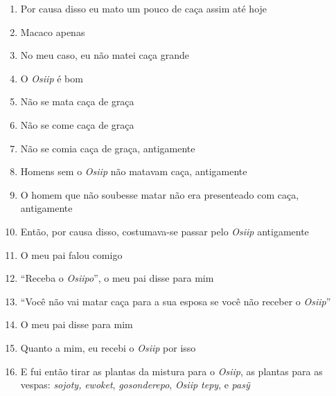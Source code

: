 \begin{enumerate}
 \item Por causa disso eu mato um pouco de caça assim até hoje

 \item Macaco apenas

 \item No meu caso, eu não matei caça grande

 \begin{center}\end{center}

 \item O \textit{Osiip} é bom

 \item Não se mata caça de graça

 \item Não se come caça de graça

 \item Não se comia caça de graça, antigamente

 \item Homens sem o \textit{Osiip} não matavam caça, antigamente

 \item O homem que não soubesse matar não era presenteado com caça,
 antigamente

 \item Então, por causa disso, costumava-se passar pelo \textit{Osiip}
 antigamente

 \begin{center}\end{center}

 \item O meu pai falou comigo

 \item ``Receba o \textit{Osiipo}'', o meu pai disse para mim

 \item ``Você não vai matar caça para a sua esposa se você não receber o
 \textit{Osiip}''

 \item O meu pai disse para mim

 \begin{center}\end{center}

 \item Quanto a mim, eu recebi o \textit{Osiip} por isso

 \item E fui então tirar as plantas da mistura para o \textit{Osiip}, as
 plantas para as vespas: \textit{sojoty,} \textit{ewoket},
 \textit{gosonderepo}, \textit{Osiip tepy}, e \textit{pasỹ}


\end{enumerate}
